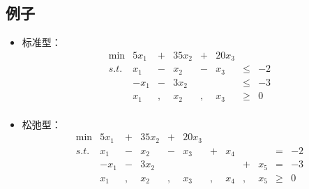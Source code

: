 	\subsection{例子}
	\begin{itemize}
		\item 标准型：
			\[
			\begin{array}{rrrrrrrrrrrrl}
 				\min & 5 x_1     &+&  35 x_2    &+& 20 x_3 & & \\
 				s.t.  &   x_1     &-&     x_2    &-& x_3 & \leq & -2   \\
      				  &   -x_1     &-&  3x_2     & &        & \leq & -3   \\
      				  &   x_1     &,&   x_2      &,&  x_3& \geq & 0   \\
			\end{array} \nonumber
			\]
		\item 松弛型：
			\[
			\begin{array}{rrrrrrrrrrrrl}
 				\min & 5 x_1     &+&  35 x_2    &+& 20 x_3  & &           & &                    \\
 				s.t. &   x_1     &-&     x_2    &-& x_3              &+& x_4   & &                     & = & -2   \\
      				 &   -x_1     &-&  3x_2      & &          &  &         &+& x_5              & = & -3   \\
      				 &   x_1     &,&   x_2      &,&  x_3   &, &  x_4 &,& x_5               & \geq & 0   \\
			\end{array} \nonumber
			\]
	\end{itemize}
